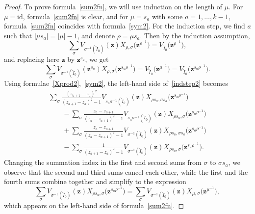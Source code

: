 \documentclass[10pt,a4paper]{amsart}
\numberwithin{equation}{section}
\newcommand{\id}{\mathrm{id}}
\begin{document}
\begin{proof}
To prove formula~\eqref{sum2fn}, we will use induction on the length of $\mu$. For $\mu=\id$, formula~\eqref{sum2fn} is clear, and for $\mu=s_a$ with some $a=1,\dots,k-1$, formula~\eqref{sum2fn} coincides with formula~\eqref{sym2}. For the induction step, we find $a$ such that $|\mu s_a|=|\mu|-1$, and denote $\rho=\mu s_a$. Then by the induction assumption,
\begin{equation*}
\sum_{\sigma} V_{\sigma^{-1}(\check{I}_0)}(\boldsymbol{z})X_{\rho,\sigma }\bigl(\boldsymbol{z}^{\rho^{-1}}\bigr) =V_{\check{I}_0}\bigl(\boldsymbol{z}^{\rho^{-1}}\bigr),
\end{equation*}
and replacing here $\boldsymbol{z}$ by $\boldsymbol{z}^{s_a}$, we get
\begin{equation}\label{indstep2}
\sum_{\sigma} V_{\sigma^{-1}(\check{I}_0)}(\boldsymbol{z}^{s_a})X_{\rho,\sigma }\bigl(\boldsymbol{z}^{s_a\rho^{-1}}\bigr)=V_{\check{I}_0}\bigl(\boldsymbol{z}^{\mu^{-1}}\bigr)= V_{\check{I}_0}\bigl(\boldsymbol{z}^{s_a\rho ^{-1}}\bigr).
\end{equation}
Using formulae~\eqref{Xprod2},~\eqref{sym2}, the left-hand side of~\eqref{indstep2} becomes
\begin{gather*}
\sum_{\sigma} \frac{(z_{a+1}-z_a)^2}{(z_{a+1}-z_{a})^2-1}V_{s_a\sigma^{-1}(\check{I}_0)}(\boldsymbol{z})X_{\rho s_a,\sigma s_a}\bigl(\boldsymbol{z}^{s_a\rho^{-1}}\bigr) \\
\qquad{}-\sum_{\sigma}\frac{z_a-z_{a+1}}{(z_a-z_{a+1})^2-1}V_{s_a\sigma^{-1}(\check{I}_0)}(\boldsymbol{z})X_{\rho s_a,\sigma }\bigl(\boldsymbol{z}^{s_a\rho^{-1}}\bigr)
\\
\qquad{}+\sum_{\sigma} \frac{z_a-z_{a+1}}{(z_a-z_{a+1})^2-1}V_{\sigma^{-1}(\check{I}_0)}(\boldsymbol{z})X_{\rho s_a,\sigma s_a}\bigl(\boldsymbol{z}^{s_a\rho^{-1}}\bigr) \\
\qquad{}-\sum_{\sigma} \frac{1}{(z_{a+1}-z_{a})^2-1}V_{\sigma^{-1}(\check{I}_0)}(\boldsymbol{z})X_{\rho s_a, \sigma }\bigl(\boldsymbol{z}^{s_a\rho^{-1}}\bigr).
\end{gather*}
Changing the summation index in the first and second sums from $\sigma$ to $\sigma s_a$, we observe that the second and third sums cancel each other, while the first and the fourth sums combine together and simplify to the expression
\begin{equation*}
\sum_{\sigma} V_{\sigma^{-1}(\check{I}_0)}(\boldsymbol{z})X_{\rho s_a,\sigma }\bigl(\boldsymbol{z}^{s_a\rho^{-1}}\bigr) =\sum_{\sigma} V_{\sigma^{-1}(\check{I}_0)}(\boldsymbol{z})X_{\mu,\sigma }\bigl(\boldsymbol{z}^{\mu^{-1}}\bigr),
\end{equation*}
which appears on the left-hand side of formula~\eqref{sum2fn}.
\end{proof}
\end{document}
